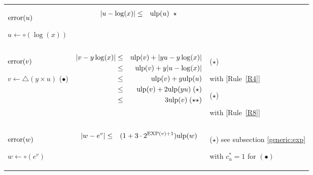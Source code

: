 \documentclass[12pt]{amsart}
\def\pinf{\bigtriangleup}
\def\ulp{{\rm ulp}}
\def\Exp{{\rm EXP}}
\newcommand{\U}[1]{\quad \mbox{[Rule~\ref{#1}]}}
\begin{document}
\begin{center}
\begin{tabular}{l l l}

\begin{minipage}{2.5cm}


${\textnormal{error}}(u)$


$u \leftarrow \circ(\log(x))$

\end{minipage} &
\begin{minipage}{7.5cm}

\begin{eqnarray}\nonumber
  |u-\log(x)| &\leq& \ulp(u)\;\;\star
\end{eqnarray}

\end{minipage} &
\begin{minipage}{6cm}

\end{minipage}\\%
\begin{minipage}{2.5cm}
${\textnormal{error}}(v)$


$v \leftarrow \pinf(y \times u) $
($\bullet$)
\end{minipage} &
\begin{minipage}{7.5cm}

\begin{eqnarray}\nonumber
  |v-y\log(x)| &\leq& \ulp(v) + |y u-y \log(x)|\\\nonumber
   &\leq& \ulp(v) + y|u-\log(x)|\\\nonumber
   &\leq& \ulp(v) + y \ulp(u)\\\nonumber
   &\leq& \ulp(v) + 2 \ulp(yu) \;(\star)\\\nonumber
   &\leq& 3 \ulp(v)  \;(\star\star)
\end{eqnarray}


\end{minipage} &
\begin{minipage}{6cm}
($\star$)

with \U{R4}

($\star$)

with \U{R8}

\end{minipage}\\%
\begin{minipage}{2.5cm}
${\textnormal{error}}(w)$


$w \leftarrow \circ(e^v) $

\end{minipage} &
\begin{minipage}{7.5cm}
\begin{eqnarray}\nonumber
  |w-e^v| &\leq& (1+3 \cdot 2^{\Exp(v)+1}) \ulp(w)
\end{eqnarray}
\end{minipage} &
\begin{minipage}{6cm}
($\star$)
see subsection \ref{generic:exp}

with $c_u^* = 1$ for $(\bullet)$
\end{minipage}
\end{tabular}
\end{center}
\end{document}
